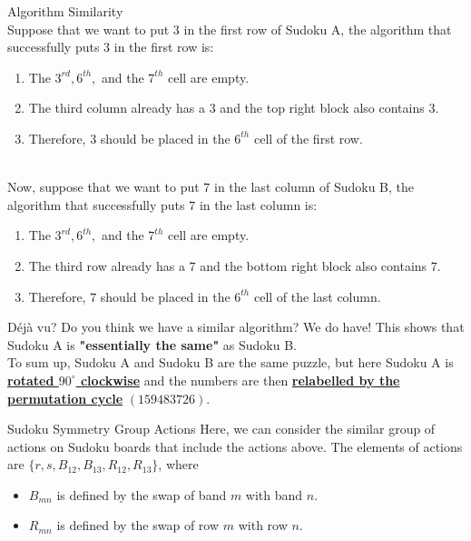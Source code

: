 \documentclass[final]{beamer}
\newlength{\colwidth}
\begin{document}
\begin{frame}[t]
\begin{columns}[t]
\begin{column}{\colwidth}
\begin{alertblock}{\Large Algorithm Similarity}
    \large {}\\ 
   Suppose that we want to put $3$ in the first row of Sudoku A, the algorithm that successfully puts $3$ in the first row is:
   \begin{enumerate}
       \item The $3^{rd}, 6^{th},$ and the $7^{th}$ cell are empty.
       \item The third column already has a $3$ and the top right block also contains $3$.
       \item Therefore, $3$ should be placed in the $6^{th}$ cell of the first row.
   \end{enumerate}
   \\
   Now, suppose that we want to put $7$ in the last column of Sudoku B, the algorithm that successfully puts $7$ in the last column is:
   \begin{enumerate}
       \item The $3^{rd}, 6^{th},$ and the $7^{th}$ cell are empty.
       \item The third row already has a $7$ and the bottom right block also contains $7$.
       \item Therefore, $7$ should be placed in the $6^{th}$ cell of the last column.
   \end{enumerate}
  \end{alertblock}
\begin{block}{\Large Déjà vu?}
  \large \large Do you think we have a similar algorithm? We do have! This shows that Sudoku A is \textbf{"essentially the same"} as Sudoku B. \\
  \vspace{\baselineskip}
  To sum up, Sudoku A and Sudoku B are the same puzzle, but here Sudoku A is \textbf{\underline{rotated $90^{\circ}$ clockwise}} and the numbers are then \textbf{\underline{relabelled by the permutation cycle}} $(159483726)$.
  \end{block} 

  \begin{alertblock}{\Large Sudoku Symmetry Group Actions}
    \large Here, we can consider the similar group of actions on Sudoku boards that include the actions above. The elements of actions are $\{ r,s,B_{12},B_{13},R_{12},R_{13} \}$, where
    \begin{itemize}
        \item $B_{mn}$ is defined by the swap of band $m$ with band $n$.
        \item $R_{mn}$ is defined by the swap of row $m$ with row $n$.
    \end{itemize}
    \end{alertblock}


\end{column}
\end{columns}
\end{frame}
\end{document}
